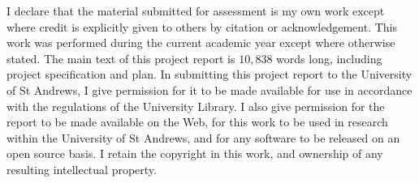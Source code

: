 I declare that the material submitted for assessment is my own work except where credit is explicitly given to others by citation or acknowledgement. This work was performed during the current academic year except where otherwise stated. The main text of this project report is $10,838$  words long, including project specification and plan. In submitting this project report to the University of St Andrews, I give permission for it to be made available for use in accordance with the regulations of the University Library. I also give permission for the report to be made available on the Web, for this work to be used in research within the University of St Andrews, and for any software to be released on an open source basis. I retain the copyright in this work, and ownership of any resulting intellectual property.
